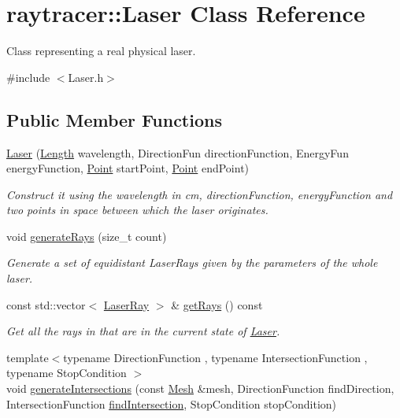 \hypertarget{classraytracer_1_1Laser}{}\section{raytracer\+:\+:Laser Class Reference}
\label{classraytracer_1_1Laser}


Class representing a real physical laser.  




{\ttfamily \#include $<$Laser.\+h$>$}

\subsection*{Public Member Functions}
\begin{DoxyCompactItemize}
\item 
\hyperlink{classraytracer_1_1Laser_a141316bde09381a6f621b2df196690a0}{Laser} (\hyperlink{structraytracer_1_1Length}{Length} wavelength, Direction\+Fun direction\+Function, Energy\+Fun energy\+Function, \hyperlink{classraytracer_1_1Point}{Point} start\+Point, \hyperlink{classraytracer_1_1Point}{Point} end\+Point)
\begin{DoxyCompactList}\small\item\em Construct it using the wavelength in cm, direction\+Function, energy\+Function and two points in space between which the laser originates. \end{DoxyCompactList}\item 
void \hyperlink{classraytracer_1_1Laser_a30ab139c3170d769fffe1c2678615bf2}{generate\+Rays} (size\+\_\+t count)
\begin{DoxyCompactList}\small\item\em Generate a set of equidistant Laser\+Rays given by the parameters of the whole laser. \end{DoxyCompactList}\item 
const std\+::vector$<$ \hyperlink{classraytracer_1_1LaserRay}{Laser\+Ray} $>$ \& \hyperlink{classraytracer_1_1Laser_a1178e8800c8cd90d5274b2854c9f2fe5}{get\+Rays} () const
\begin{DoxyCompactList}\small\item\em Get all the rays in that are in the current state of \hyperlink{classraytracer_1_1Laser}{Laser}. \end{DoxyCompactList}\item 
{\footnotesize template$<$typename Direction\+Function , typename Intersection\+Function , typename Stop\+Condition $>$ }\\void \hyperlink{classraytracer_1_1Laser_a40fd2b112fb1de646861d7e93ac303e3}{generate\+Intersections} (const \hyperlink{classraytracer_1_1Mesh}{Mesh} \&mesh, Direction\+Function find\+Direction, Intersection\+Function \hyperlink{namespaceraytracer_ae44c3032cf96db5f4ba9c07f12c9a207}{find\+Intersection}, Stop\+Condition stop\+Condition)

\end{DoxyCompactItemize}
